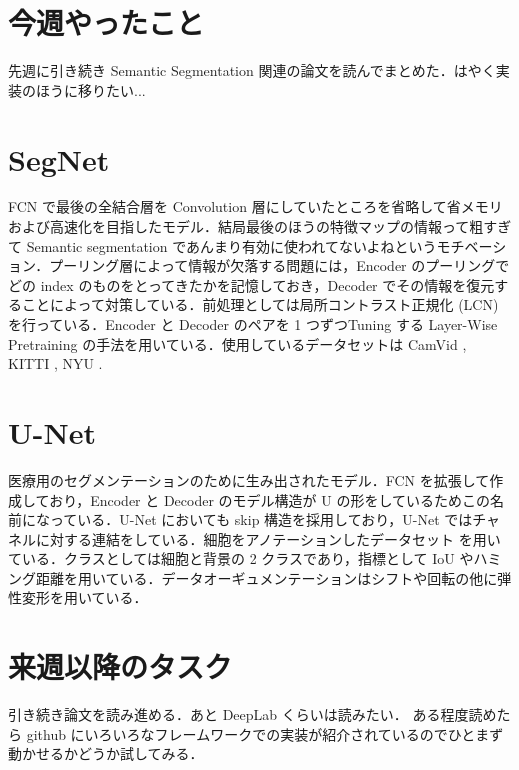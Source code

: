 \documentclass[onecolumn]{ujarticle}     %
\begin{document}
	
	\section{今週やったこと}
	先週に引き続き Semantic Segmentation 関連の論文を読んでまとめた．はやく実装のほうに移りたい...
	
	\section{SegNet \cite{badrinarayanan2015segnet2}}
	FCN で最後の全結合層を Convolution 層にしていたところを省略して省メモリおよび高速化を目指したモデル．結局最後のほうの特徴マップの情報って粗すぎて Semantic segmentation であんまり有効に使われてないよねというモチベーション．プーリング層によって情報が欠落する問題には，Encoder のプーリングでどの index のものをとってきたかを記憶しておき，Decoder でその情報を復元することによって対策している．前処理としては局所コントラスト正規化 (LCN) を行っている．Encoder と Decoder のペアを 1 つずつTuning する Layer-Wise Pretraining の手法を用いている．使用しているデータセットは CamVid \cite{BrostowSFC:ECCV08, BrostowFC:PRL2008}, KITTI \cite{Geiger2013IJRR}, NYU \cite{Silberman2011IndoorSS}.
	
	\section{U-Net \cite{DBLP:journals/corr/RonnebergerFB15}}
	医療用のセグメンテーションのために生み出されたモデル．FCN を拡張して作成しており，Encoder と Decoder のモデル構造が U の形をしているためこの名前になっている．U-Net においても skip 構造を採用しており，U-Net ではチャネルに対する連結をしている．細胞をアノテーションしたデータセット \cite{10.1093/bioinformatics/btu080} を用いている．クラスとしては細胞と背景の 2 クラスであり，指標として IoU やハミング距離を用いている．データオーギュメンテーションはシフトや回転の他に弾性変形を用いている．
	

	\section{来週以降のタスク}
	引き続き論文を読み進める．あと DeepLab くらいは読みたい．
	ある程度読めたら github にいろいろなフレームワークでの実装が紹介されているのでひとまず動かせるかどうか試してみる．
	
	
	
\end{document}
